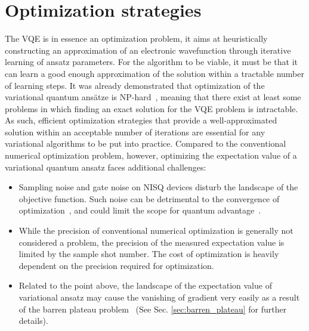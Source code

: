 \section{Optimization strategies} \label{sec:Optimization}

The VQE is in essence an optimization problem, it aims at heuristically constructing an approximation of an electronic wavefunction through iterative learning of ansatz parameters. For the algorithm to be viable, it must be that it can learn a good enough approximation of the solution within a tractable number of learning steps. It was already demonstrated that optimization of the variational quantum ans{\"{a}}tze is NP-hard~\cite{Bittel2021}, meaning that there exist at least some problems in which finding an exact solution for the VQE problem is intractable. As such, efficient optimization strategies that provide a well-approximated solution within an acceptable number of iterations are essential for any variational algorithms to be put into practice. Compared to the conventional numerical optimization problem, however, optimizing the expectation value of a variational quantum ansatz faces additional challenges: 
\begin{itemize}
    \item Sampling noise and gate noise on NISQ devices disturb the landscape of the objective function. Such noise can be detrimental to the convergence of optimization~\cite{gentini_noise-resilient_2020, Wang2020}, and could limit the scope for quantum advantage~\cite{Franca2021}. 
    \item While the precision of conventional numerical optimization is generally not considered a problem, the precision of the measured expectation value is limited by the sample shot number. The cost of optimization is heavily dependent on the precision required for optimization. 
    \item Related to the point above, the landscape of the expectation value of variational ansatz may cause the vanishing of gradient very easily as a result of the barren plateau problem~\cite{McClean2018} (See Sec. \ref{sec:barren_plateau} for further details).
\end{itemize}

